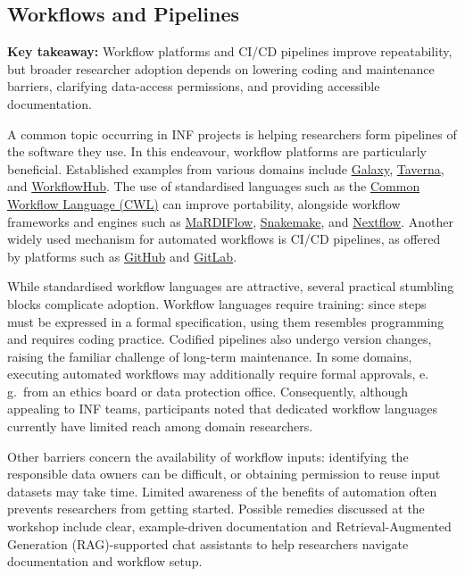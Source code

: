 \documentclass{eceasst}
\newcommand{\eg}{e.\,g.}
\begin{document}
\subsection{Workflows and Pipelines}
\noindent\textbf{Key takeaway:} Workflow platforms and CI/CD pipelines improve repeatability, but broader researcher adoption depends on lowering coding and maintenance barriers, clarifying data-access permissions, and providing accessible documentation.

\medskip
\noindent A common topic occurring in INF projects is helping researchers form pipelines of the software they use.
In this endeavour, workflow platforms are particularly beneficial.
Established examples from various domains include \href{https://galaxyproject.github.io/}{Galaxy}, \href{https://esciencelab.org.uk/products/taverna/}{Taverna}, and \href{https://workflowhub.eu/}{WorkflowHub}.
The use of standardised languages such as the \href{https://www.commonwl.org/}{Common Workflow Language (CWL)} can improve portability, alongside workflow frameworks and engines such as \href{https://www.mardi4nfdi.de/portal/services}{MaRDIFlow}, \href{https://snakemake.readthedocs.io/en/stable/}{Snakemake}, and \href{https://www.nextflow.io/}{Nextflow}.
Another widely used mechanism for automated workflows is CI/CD pipelines,
as offered by platforms such as \href{https://github.com/}{GitHub} and \href{https://about.gitlab.com/}{GitLab}.

While standardised workflow languages are attractive, several practical stumbling blocks complicate adoption.
Workflow languages require training: since steps must be expressed in a formal specification, using them resembles programming and requires coding practice.
Codified pipelines also undergo version changes, raising the familiar challenge of long-term maintenance.
In some domains, executing automated workflows may additionally require formal approvals, \eg~from an ethics board or data protection office.
Consequently, although appealing to INF teams, participants noted that dedicated workflow languages currently have limited reach among domain researchers.

Other barriers concern the availability of workflow inputs: identifying the responsible data owners can be difficult, or obtaining permission to reuse input datasets may take time.
Limited awareness of the benefits of automation often prevents researchers from getting started.
Possible remedies discussed at the workshop include clear, example-driven documentation and Retrieval-Augmented Generation (RAG)-supported chat assistants to help researchers navigate documentation and workflow setup.
\vspace{-1em}
\end{document}
